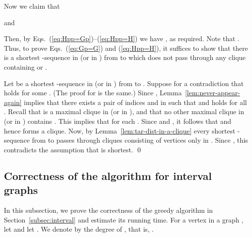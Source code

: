 \documentclass{llncs}
\begin{document}
	Now we claim that 
	
and
	
	Then, by Eqs.~(\ref{eq:Hpp=Gp})--(\ref{eq:Hpp=H}) we have , as required.
	Note that .
	Thus, to prove Eqs.~(\ref{eq:Gp=G}) and (\ref{eq:Hpp=H}), it suffices to show that there is a shortest -sequence in  (or in ) from  to  which does not pass through any clique containing  or .   
	
	Let  be a shortest -sequence in  (or in ) from  to .
	Suppose for a contradiction that  holds for some .
(The proof for  is the same.)
	Since , Lemma~\ref{lem:never-appear-again} implies that there exists a pair of indices  and  in  such that  and  holds for all .
	Recall that  is a maximal clique in  (or in ), and that no other maximal clique in  (or in ) contains .
	This implies that  for each .
	Since  and , it follows that  and hence  forms a clique.
	Now, by Lemma~\ref{lem:tar-dist-in-a-clique} every shortest -sequence from  to  passes through cliques consisting of vertices only in .
	Since , this contradicts the assumption that  is shortest.
\qed




	\subsection{Correctness of the algorithm for interval graphs} \label{app:interval-algo}
	
	In this subsection, we prove the correctness of the greedy algorithm in Section~\ref{subsec:interval} and estimate its running time.
	For a vertex  in a graph , let  and let .
	We denote by  the degree of , that is, .
\medskip
\end{document}
